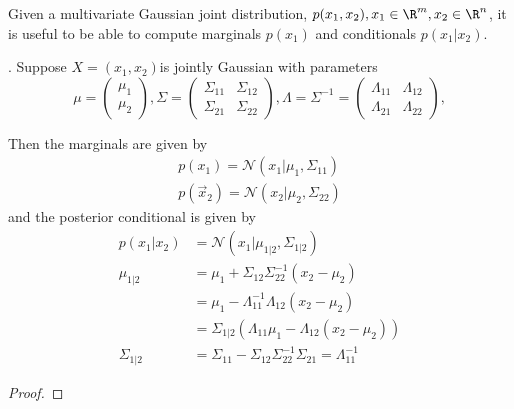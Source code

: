 \begin{refsection}
\begin{remark}
Given a multivariate Gaussian joint distribution, $p(x_1,x_2),x_1\in \R^m, x_2\in \R^n$, it is useful to be able to compute marginals $p(x_1)$ and conditionals $p(x_1|x_2)$. 	
\end{remark}


\begin{theorem}. Suppose $X=(x_1,x_2)$is jointly Gaussian with parameters
	\begin{equation}
	\mu=\left(\begin{array}{c}\mu_1 \\
	\mu_2\end{array}\right),
	\Sigma=\left(\begin{array}{cc}
	\Sigma_{11} & \Sigma_{12} \\
	\Sigma_{21} & \Sigma_{22} \end{array}\right),
	\Lambda=\Sigma^{-1}=\left(\begin{array}{cc}
	\Lambda_{11} & \Lambda_{12} \\
	\Lambda_{21} & \Lambda_{22} \end{array}\right),
	\end{equation}
	
	Then the marginals are given by
	\begin{equation}
	\begin{split}
	p(x_1)= \mathcal{N}(x_1|\mu_1,\Sigma_{11})\\
	p(\vec{x}_2)= \mathcal{N}(x_2|\mu_2,\Sigma_{22})
	\end{split}
	\end{equation}
	and the posterior conditional is given by
	\begin{equation}\label{eqn:Marginals-and-conditionals-of-an-MVN}
	\boxed{\begin{split}
		p(x_1|x_2)& =\mathcal{N}(x_1|\mu_{1|2},\Sigma_{1|2}) \\
		\mu_{1|2}& = \mu_1+\Sigma_{12}\Sigma_{22}^{-1}(x_2-\mu_2) \\
		& = \mu_1-\Lambda_{11}^{-1}\Lambda_{12}(x_2-\mu_2) \\
		& = \Sigma_{1|2}(\Lambda_{11}\mu_1-\Lambda_{12}(x_2-\mu_2)) \\
		\Sigma_{1|2}& = \Sigma_{11}-\Sigma_{12}\Sigma_{22}^{-1}\Sigma_{21}=\Lambda_{11}^{-1}
		\end{split}}
	\end{equation}
\end{theorem}
\begin{proof}
	

\end{proof}
\end{refsection}
